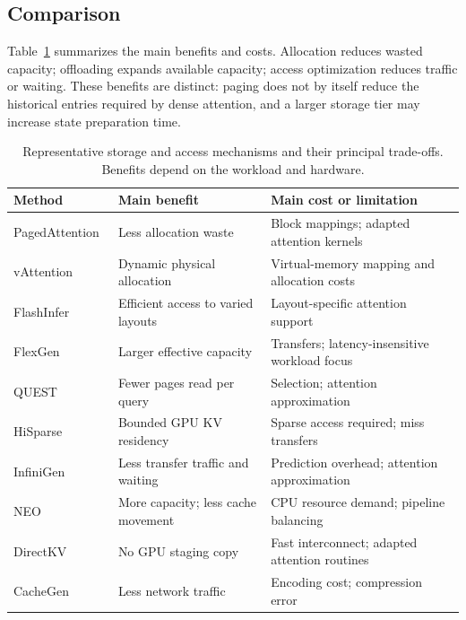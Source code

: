 \subsection{Comparison}\label{sec:techniques:storage-summary}

Table~\ref{tab:storage-comparison} summarizes the main benefits and costs. Allocation reduces wasted capacity; offloading expands available capacity; access optimization reduces traffic or waiting. These benefits are distinct: paging does not by itself reduce the historical entries required by dense attention, and a larger storage tier may increase state preparation time.

\begin{table}[tbp]
    \centering
    \caption{Representative storage and access mechanisms and their principal trade-offs. Benefits depend on the workload and hardware.}
    \label{tab:storage-comparison}
    \begingroup
    \footnotesize
    \setlength{\tabcolsep}{4pt}
    \renewcommand{\arraystretch}{1.15}
    \begin{tabularx}{\textwidth}{@{}>{\raggedright\arraybackslash}p{}>{\raggedright\arraybackslash}p{}>{\raggedright\arraybackslash}X@{}}
        \toprule
        \textbf{Method} & \textbf{Main benefit} & \textbf{Main cost or limitation} \\
        \midrule
        PagedAttention~\cite{kv_kwon2023pagedattention} & Less allocation waste & Block mappings; adapted attention kernels \\
        vAttention~\cite{kv_prabhu2025vattention} & Dynamic physical allocation & Virtual-memory mapping and allocation costs \\
        FlashInfer~\cite{kv_ye2025flashinfer} & Efficient access to varied layouts & Layout-specific attention support \\
        \addlinespace[4pt]
        FlexGen~\cite{kv_sheng2023flexgen} & Larger effective capacity & Transfers; latency-insensitive workload focus \\
        QUEST~\cite{kv_tang2024quest} & Fewer pages read per query & Selection; attention approximation \\
        HiSparse~\cite{kv_xie2026hisparse} & Bounded GPU KV residency & Sparse access required; miss transfers \\
        InfiniGen~\cite{kv_lee2024infinigen} & Less transfer traffic and waiting & Prediction overhead; attention approximation \\
        NEO~\cite{kv_jiang2025neo} & More capacity; less cache movement & CPU resource demand; pipeline balancing \\
        DirectKV~\cite{kv_luo2026directkv} & No GPU staging copy & Fast interconnect; adapted attention routines \\
        \addlinespace[4pt]
        CacheGen~\cite{kv_liu2024cachegen} & Less network traffic & Encoding cost; compression error \\
        \bottomrule
    \end{tabularx}
    \endgroup
\end{table}

